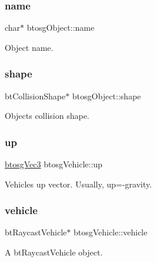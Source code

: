 \subsubsection{\texorpdfstring{name}{name}}
{\footnotesize\ttfamily char$\ast$ btosg\+Object\+::name\hspace{0.3cm}{\ttfamily [inherited]}}



Object name. 

\mbox{\label{classbtosgObject_a0f6a8da01cf643c321bffe86e42604b0}} 
\subsubsection{\texorpdfstring{shape}{shape}}
{\footnotesize\ttfamily bt\+Collision\+Shape$\ast$ btosg\+Object\+::shape\hspace{0.3cm}{\ttfamily [inherited]}}



Object\textquotesingle{}s collision shape. 

\mbox{\label{classbtosgVehicle_a84705afaa9e37bb8a0bd7f6b6f291c26}} 
\subsubsection{\texorpdfstring{up}{up}}
{\footnotesize\ttfamily \hyperlink{classbtosgVec3}{btosg\+Vec3} btosg\+Vehicle\+::up}



Vehicle\textquotesingle{}s up vector. Usually, up=-\/gravity. 

\mbox{\label{classbtosgVehicle_ac45b117f8b523f7040de99639deb7522}} 
\subsubsection{\texorpdfstring{vehicle}{vehicle}}
{\footnotesize\ttfamily bt\+Raycast\+Vehicle$\ast$ btosg\+Vehicle\+::vehicle}



A bt\+Raycast\+Vehicle object. 

